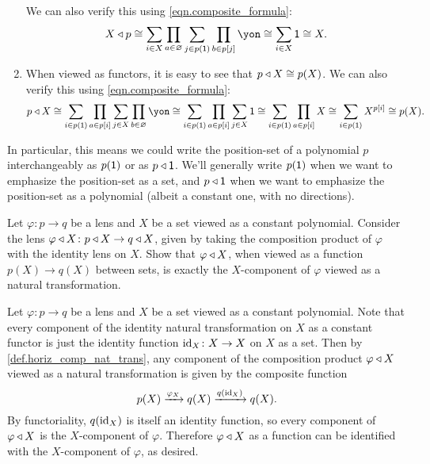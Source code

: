 \documentclass[Book-Poly]{subfiles}
\begin{document}
\begin{exercise}
\begin{solution}
\begin{enumerate}[resume]
    We can also verify this using \eqref{eqn.composite_formula}:
    \[
        X \tri p \iso \sum_{i \in X} \prod_{a \in \varnothing} \sum_{j \in p(\1)} \prod_{b \in p[j]} \yon \iso \sum_{i \in X} \1 \iso X.
    \]
    \item When viewed as functors, it is easy to see that $p \mathbin{\triangleleft} X \cong p(X)$.
    We can also verify this using \eqref{eqn.composite_formula}:
    \[
        p \tri X \iso \sum_{i \in p(\1)} \prod_{a \in p[i]} \sum_{j \in X} \prod_{b \in \varnothing} \yon \iso \sum_{i \in p(\1)} \prod_{a \in p[i]} \sum_{j \in X} \1 \iso \sum_{i \in p(\1)} \prod_{a \in p[i]} X \iso \sum_{i \in p(\1)} X^{p[i]} \iso p(X).
    \]
\end{enumerate}
\end{solution}
\end{exercise}

In particular, this means we could write the position-set of a polynomial $p$ interchangeably as $p(\textsf{1})$ or as $p\mathbin{\triangleleft}\textsf{1}$.
We'll generally write $p(\textsf{1})$ when we want to emphasize the position-set as a set, and $p\mathbin{\triangleleft}\textsf{1}$ when we want to emphasize the position-set as a polynomial (albeit a constant one, with no directions).

\begin{exercise}
Let $\varphi\colon p\to q$ be a lens and $X$ be a set viewed as a constant polynomial.
Consider the lens $\varphi\mathbin{\triangleleft} X\colon p\mathbin{\triangleleft} X\to q\mathbin{\triangleleft} X$, given by taking the composition product of $\varphi$ with the identity lens on $X$.
Show that $\varphi\mathbin{\triangleleft} X$, when viewed as a function $p(X)\to q(X)$ between sets, is exactly the $X$-component of $\varphi$ viewed as a natural transformation.
\begin{solution}
Let $\varphi\colon p\to q$ be a lens and $X$ be a set viewed as a constant polynomial.
Note that every component of the identity natural transformation on $X$ as a constant functor is just the identity function $\mathrm{id}_X\colon X\to X$ on $X$ as a set.
Then by \cref{def.horiz_comp_nat_trans}, any component of the composition product $\varphi\mathbin{\triangleleft} X$ viewed as a natural transformation is given by the composite function
\[
    p(X) \xrightarrow{\varphi_X} q(X) \xrightarrow{q(\mathrm{id}_X)} q(X).
\]
By functoriality, $q(\mathrm{id}_X)$ is itself an identity function, so every component of $\varphi\mathbin{\triangleleft} X$ is the $X$-component of $\varphi$.
Therefore $\varphi\mathbin{\triangleleft} X$ as a function can be identified with the $X$-component of $\varphi$, as desired.
\end{solution}
\end{exercise}
\end{document}
